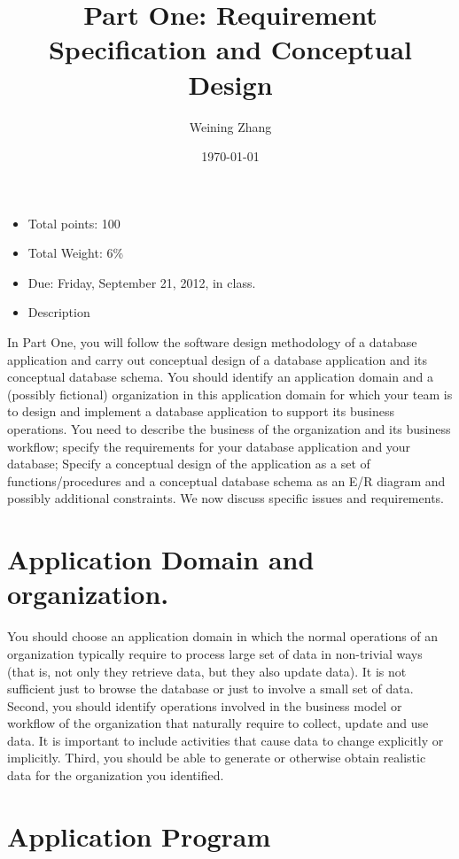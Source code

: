 \documentclass[11pt]{article}
\title{Part One: Requirement Specification and Conceptual Design}
\author{Weining Zhang}
\date{\today}
\begin{document}
\maketitle


\begin{itemize}
\item Total points: 100
\item Total Weight: 6\%
\item Due: Friday, September 21, 2012, in class.
\item Description
\end{itemize}

In Part One, you will follow the software design methodology of a
database application and carry out conceptual design of a database
application and its conceptual database schema. You should identify an
application domain and a (possibly fictional) organization in this
application domain for which your team is to design and implement a
database application to support its business operations. You need to
describe the business of the organization and its business workflow;
specify the requirements for your database application and your
database; Specify a conceptual design of the application as a set of
functions/procedures and a conceptual database schema as an E/R
diagram and possibly additional constraints. We now discuss specific
issues and requirements.

\section*{Application Domain and organization.}
\label{sec-1}


  You should choose an application domain in which the normal operations
  of an organization typically require to process large set of data in
  non-trivial ways (that is, not only they retrieve data, but they also
  update data). It is not sufficient just to browse the database or just
  to involve a small set of data. Second, you should identify operations
  involved in the business model or workflow of the organization that
  naturally require to collect, update and use data. It is important to
  include activities that cause data to change explicitly or
  implicitly. Third, you should be able to generate or otherwise obtain
  realistic data for the organization you identified.
\section*{Application Program}
\label{sec-2}
\end{document}
